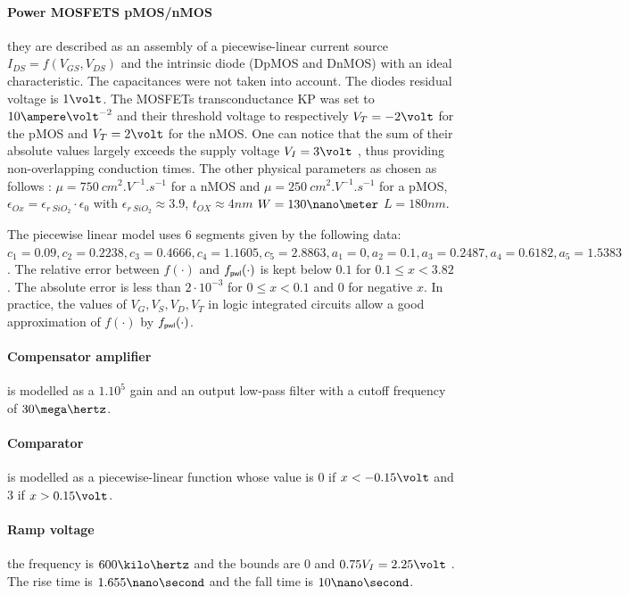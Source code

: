 \paragraph{Power MOSFETS pMOS/nMOS} they are described as an assembly of a
piecewise-linear current source $I_{DS} = f(V_{GS}, V_{DS})$ and the intrinsic diode
(DpMOS and DnMOS) with an ideal characteristic.
The capacitances were not taken into account. The diodes residual voltage is
$1\volt$. 
The MOSFETs transconductance KP was set to $10 \ampere\volt^{-2}$ and
their threshold voltage to respectively $V_T = -2 \volt$ for the pMOS and $V_T= 2 \volt$ for
the nMOS. One can notice that the sum of their absolute values largely
exceeds the supply voltage $V_{I} = 3 \volt$ , thus providing non-overlapping
conduction times. The other physical parameters as chosen as follows : $\mu = 750~cm^2.V^{-1}.s^{-1}$ for a nMOS and $\mu=250~cm^2.V^{-1}.s^{-1}$ for a pMOS, $\epsilon_{Ox} = \epsilon_{r~SiO_2} \cdot \epsilon_0$ with $\epsilon_{r~SiO_2} \approx 3.9$, $t_{OX} \approx 4 nm$ $W = 130\nano \meter$ $L=180 nm$. 

The piecewise linear model uses $6$ segments given by the following data:$ c_1 = 0.09 , c_2=0.2238 ,
c_3=0.4666 , c_4=1.1605 , c_5=2.8863,  a_1 = 0 , a_2=0.1, a_3=0.2487 , a_4=0.6182 , a_5=1.5383$. The
relative error between $f(\cdot)$ and $f_\pwl(\cdot)$ is kept below $0.1$ for $0.1 \leq x < 3.82$.
The absolute error is less than $2 \cdot 10^{-3}$ for $0 \leq x < 0.1$ and $0$ for negative $x$. In
practice, the values of $V_G,V_S,V_D,V_T$ in logic integrated circuits allow  a good approximation
of $f(\cdot)$ by $f_\pwl(\cdot)$. 


\paragraph{Compensator amplifier} is modelled as a $1.10^5$ gain and an output low-pass
filter with a cutoff frequency of $30 \mega\hertz$.
\paragraph{Comparator} is modelled as a piecewise-linear function whose value is $0$ if
$x < -0.15\volt$ and 3 if $x > 0.15\volt$.
\paragraph{Ramp voltage} the frequency is $600 \kilo\hertz$ and the bounds are $0$ and $0.75 V_I = 2.25 \volt$ .
The rise time is $1.655 \nano\second$ and the fall time is $10 \nano\second$.
